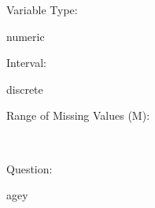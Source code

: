 \documentclass[
]{article}
\begin{document}
\begin{minipage}[t]{0.3\linewidth}

Variable Type:

\end{minipage}%
\begin{minipage}[t]{0.7\linewidth}

numeric

\end{minipage}

\begin{minipage}[t]{0.3\linewidth}

Interval:

\end{minipage}%
\begin{minipage}[t]{0.7\linewidth}

discrete

\end{minipage}

\begin{minipage}[t]{0.3\linewidth}

Range of Missing Values (M):

\end{minipage}%
\begin{minipage}[t]{0.7\linewidth}

~

\end{minipage}

\begin{minipage}[t]{0.3\linewidth}

Question:

\end{minipage}%
\begin{minipage}[t]{0.7\linewidth}

agey

\end{minipage}
\end{document}
